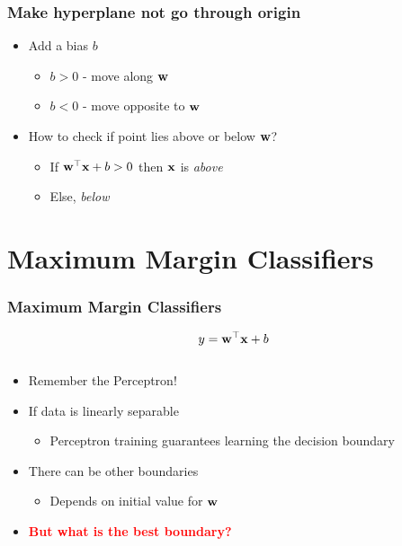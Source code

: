 \documentclass[10pt]{beamer}
\begin{document}
\begin{frame}
{
  \frametitle{Make hyperplane not go through origin}
}
\begin{itemize}
\item Add a bias $b$
  \begin{itemize}
  \item $b > 0$ - move along ${\bf w}$
  \item $b < 0$ - move opposite to ${\bf w}$
  \end{itemize}
\item How to check if point lies above or below ${\bf w}$?
  \begin{itemize}
  \item If ${\bf w}^\top{\bf x} + b > 0$ then ${\bf x}$ is {\em above}
  \item Else, {\em below}
  \end{itemize}
\end{itemize}
\end{frame}
\section{Maximum Margin Classifiers}
\begin{frame}
      {
        \frametitle{Maximum Margin Classifiers}
      }
      \[
      y = {\bf w}^\top{\bf x} + b
      \]
      \begin{columns}
        \begin{column}{0.5\textwidth}
          \begin{itemize}
          \item Remember the Perceptron!
          \item If data is linearly separable
            \begin{itemize}
              \item Perceptron training guarantees learning the decision boundary
            \end{itemize}
            \item There can be other boundaries
              \begin{itemize}
              \item Depends on initial value for ${\bf w}$
              \end{itemize}
            \item<3-> \textcolor{red}{\bf But what is the best boundary?}
          \end{itemize}
        \end{column}
        \begin{column}{0.5\textwidth}
          
        \end{column}
        \end{columns}
\end{frame}
\end{document}
